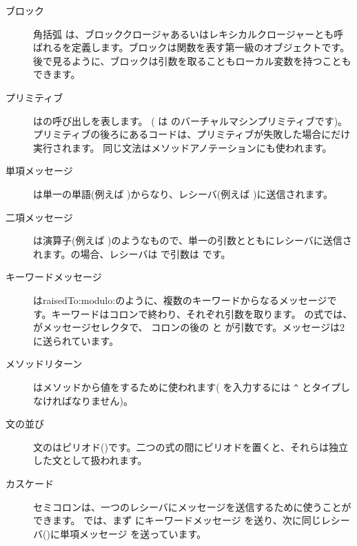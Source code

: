 \documentclass[a4paper,10pt,twoside]{book}
\begin{document}
\begin{description}
\item[ブロック] 角括弧 \ct{[ ]} は、ブロッククロージャあるいはレキシカルクロージャーとも呼ばれるを定義します。ブロックは関数を表す第一級のオブジェクトです。
		後で見るように、ブロックは引数を取ることもローカル変数を持つこともできます。

\item[プリミティブ] はの呼び出しを表します。
	( は  のバーチャルマシンプリミティブです)。
	プリミティブの後ろにあるコードは、プリミティブが失敗した場合にだけ実行されます。
	同じ文法はメソッドアノテーションにも使われます。

\item[単項メッセージ] は単一の単語(例えば )からなり、レシーバ(例えば )に送信されます。

\item[二項メッセージ] は演算子(例えば \ct{+})のようなもので、単一の引数とともにレシーバに送信されます。の場合、レシーバは  で引数は  です。

\item[キーワードメッセージ] はraisedTo:modulo:のように、複数のキーワードからなるメッセージです。キーワードはコロンで終わり、それぞれ引数を取ります。  の式では、 がメッセージセレクタで、 コロンの後の と  が引数です。メッセージは2に送られています。

\item[メソッドリターン] \ct{^}はメソッドから値をするために使われます(\ct{^} を入力するには \verb|^| とタイプしなければなりません)。

\item[文の並び] 文のはピリオド()です。二つの式の間にピリオドを置くと、それらは独立した文として扱われます。

\item[カスケード] セミコロンは、一つのレシーバにメッセージを送信するために使うことができます。 では、まず  にキーワードメッセージ  を送り、次に同じレシーバ()に単項メッセージ  を送っています。

\end{description}
\end{document}
